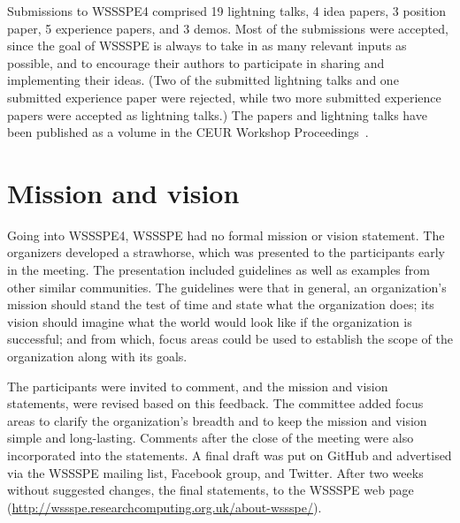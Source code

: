 \documentclass[11pt, oneside]{amsart}
\newcommand{\note}[1]{ {\textcolor{blueish}    { ***Note:      #1 }}}
\begin{document}
Submissions to WSSSPE4 comprised
19 lightning talks,
4 idea papers,
3 position paper,
5 experience papers,
and
3 demos.
Most of the submissions were accepted, since the goal of WSSSPE is always to
take in as many relevant inputs as possible, and to encourage their authors to
participate in sharing and implementing their ideas.
(Two of the submitted lightning talks and one submitted experience paper were rejected, while two more submitted experience papers
were accepted as lightning talks.)
The papers and lightning talks have been published as a volume in the CEUR Workshop Proceedings~\cite{WSSSPE4-proceedings}.

\section{Mission and vision}\label{sec:mission}


Going into WSSSPE4, WSSSPE had no formal mission or vision statement.
The organizers developed a strawhorse, which was presented to the participants early in the meeting.
The presentation included guidelines as well as examples from other similar communities.
The guidelines were that in general, an organization's mission should stand the test of time and state what the organization does; its vision should imagine what the world would look like if the organization is successful; and from which, focus areas could be used to establish the scope of the organization along with its goals.

The participants were 
invited to comment,
and 
the mission and vision statements, were revised 
based on this feedback.
The committee added focus areas to clarify the organization's breadth and to keep the mission and vision simple and long-lasting.
Comments after the close of the meeting were also incorporated into the statements.
A final draft was put on GitHub and advertised
via the WSSSPE mailing list, Facebook group, and Twitter.
After two weeks without suggested changes, the final statements, 
to the WSSSPE web page (\url{http://wssspe.researchcomputing.org.uk/about-wssspe/}).
\end{document}
